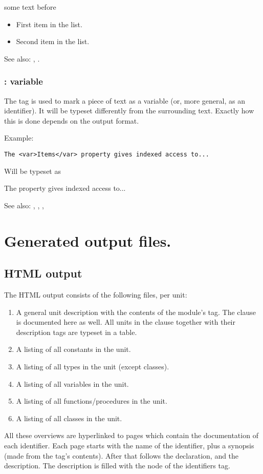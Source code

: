 some text before
\begin{itemize}
\item First item in the list.
\item Second item in the list.
\end{itemize}

See also: , .

\subsection{ : variable}
\label{tag:var}
The  tag is used to mark a piece of text as a variable (or, more
general, as an identifier). It will be typeset differently from the 
surrounding text. Exactly how this is done depends on the output format.

Example:
\begin{verbatim}
The <var>Items</var> property gives indexed access to...
\end{verbatim}
Will be typeset as

The  property gives indexed access to...

See also: , , , 


\chapter{Generated output files.}
\label{ch:outputfiles}

\section{HTML output}
The HTML output consists of the following files, per unit:

\begin{enumerate}
\item A general unit description with the contents of the module's
  tag. The  clause is documented here as well. 
All units in the  clause together with their 
 description tags are typeset in a table.
\item A listing of all constants in the unit.
\item A listing of all types in the unit (except classes).
\item A listing of all variables in the unit.
\item A listing of all functions/procedures in the unit.
\item A listing of all classes in the unit.
\end{enumerate}
All these overviews are hyperlinked to pages which contain the documentation
of each identifier. Each page starts with the name of the identifier,
plus a synopsis (made from the  tag's contents).  After that
follows the declaration, and the description. The description is filled with
the  node of the identifiers  tag.

